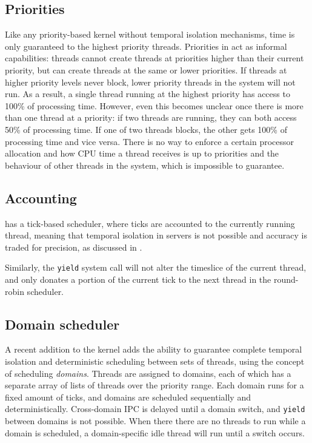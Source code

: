 \subsection{Priorities}

Like any priority-based kernel without temporal isolation mechanisms, time is only guaranteed to the highest priority threads.
Priorities in \selfour act as informal capabilities: threads cannot create threads at priorities higher than their current priority, but can create threads at the same or lower priorities.
If threads at higher priority levels never block, lower priority threads in the system will not run.
As a result, a single thread running at the highest priority has access to 100\% of processing time.
However, even this becomes unclear once there is more than one thread at a priority: if two threads are running, they can both access 50\% of processing time.
If one of two threads blocks, the other gets 100\% of processing time and vice versa.
There is no way to enforce a certain processor allocation and how CPU time a thread receives is up
to priorities and the behaviour of other threads in the system, which is impossible to guarantee.

\subsection{Accounting}
\selfour has a tick-based scheduler, where ticks are accounted to the currently running thread,
meaning that temporal isolation in servers is not possible and accuracy is traded for precision, as
discussed in .

Similarly, the \texttt{yield} system call will not alter the timeslice of the current thread, and
only donates a portion of the current tick to the next thread in the round-robin scheduler. 

\subsection{Domain scheduler}

A recent addition to the \selfour kernel adds the ability to guarantee complete temporal isolation and deterministic scheduling between sets of threads, using the concept of scheduling \emph{domains}.
Threads are assigned to domains, each of which has a separate array of lists of threads over the priority range.
Each domain runs for a fixed amount of ticks, and domains are scheduled sequentially and deterministically.
Cross-domain \gls{IPC} is delayed until a domain switch, and \texttt{yield} between domains is not
possible. When there there are no threads to run while a domain is scheduled, a domain-specific idle thread will run until a switch occurs.

